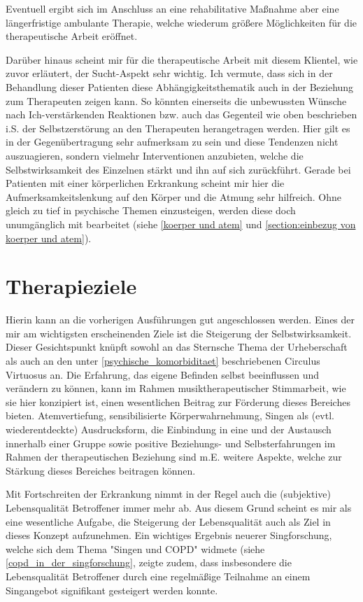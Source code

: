 Eventuell ergibt sich im Anschluss an eine rehabilitative Maßnahme aber eine längerfristige ambulante Therapie, welche wiederum größere Möglichkeiten für die therapeutische Arbeit eröffnet. 

Darüber hinaus scheint mir für die therapeutische Arbeit mit diesem Klientel, wie zuvor erläutert, der Sucht-Aspekt sehr wichtig. Ich vermute, dass sich in der Behandlung dieser Patienten diese Abhängigkeitsthematik auch in der Beziehung zum Therapeuten zeigen kann. So könnten einerseits die unbewussten Wünsche nach Ich-verstärkenden Reaktionen bzw. auch das Gegenteil wie oben beschrieben i.S. der Selbstzerstörung an den Therapeuten herangetragen werden. Hier gilt es in der Gegenübertragung sehr aufmerksam zu sein und diese Tendenzen nicht auszuagieren, sondern vielmehr Interventionen anzubieten, welche die Selbstwirksamkeit des Einzelnen stärkt und ihn auf sich zurückführt. Gerade bei Patienten mit einer körperlichen Erkrankung scheint mir hier die Aufmerksamkeitslenkung auf den Körper und die Atmung sehr hilfreich. Ohne gleich zu tief in psychische Themen einzusteigen, werden diese doch unumgänglich mit bearbeitet (siehe \ref{koerper und atem} und \ref{section:einbezug von koerper und atem}). 

\section{Therapieziele}
Hierin kann an die vorherigen Ausführungen gut angeschlossen werden. Eines der mir am wichtigsten erscheinenden Ziele ist die Steigerung der Selbstwirksamkeit. Dieser Gesichtspunkt knüpft sowohl an das Sternsche Thema der Urheberschaft als auch an den unter \ref{psychische_komorbiditaet} beschriebenen Circulus Virtuosus an. Die Erfahrung, das eigene Befinden selbst beeinflussen und verändern zu können, kann im Rahmen musiktherapeutischer Stimmarbeit, wie sie hier konzipiert ist, einen wesentlichen Beitrag zur Förderung dieses Bereiches bieten. Atemvertiefung, sensibilisierte Körperwahrnehmung, Singen als (evtl. wiederentdeckte) Ausdrucksform, die Einbindung in eine und der Austausch innerhalb einer Gruppe sowie positive Beziehungs- und Selbsterfahrungen im Rahmen der therapeutischen Beziehung sind m.E. weitere Aspekte, welche zur Stärkung dieses Bereiches beitragen können.

Mit Fortschreiten der Erkrankung nimmt in der Regel auch die (subjektive) Lebensqualität Betroffener immer mehr ab. Aus diesem Grund scheint es mir als eine wesentliche Aufgabe, die Steigerung der Lebensqualität auch als Ziel in dieses Konzept aufzunehmen. Ein wichtiges Ergebnis neuerer Singforschung, welche sich dem Thema "Singen und COPD" widmete (siehe \ref{copd_in_der_singforschung}, zeigte zudem, dass insbesondere die Lebensqualität Betroffener durch eine regelmäßige Teilnahme an einem Singangebot signifikant gesteigert werden konnte. 

